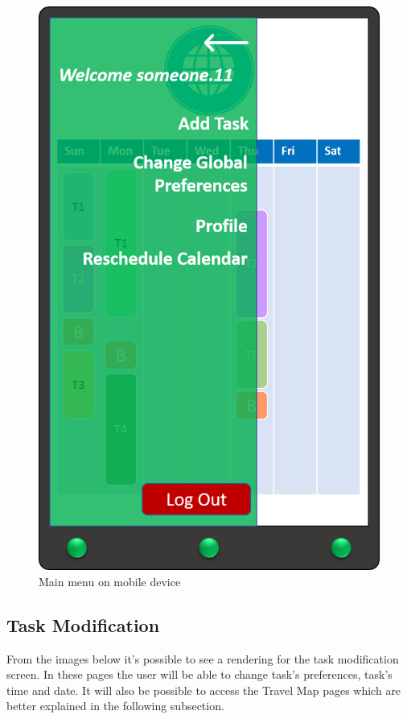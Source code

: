 \begin{figure}[H]
    \centering
    \includegraphics[scale=0.3]{Pictures/Mockups/AppMenu.png}
    \caption{Main menu on mobile device}
\end{figure}

\subsection{Task Modification}
From the images below it's possible to see a rendering for the task modification screen. In these pages the user will be able to change task's preferences, task's time and date. It will also be possible to access the Travel Map pages which are better explained in the following subsection.

